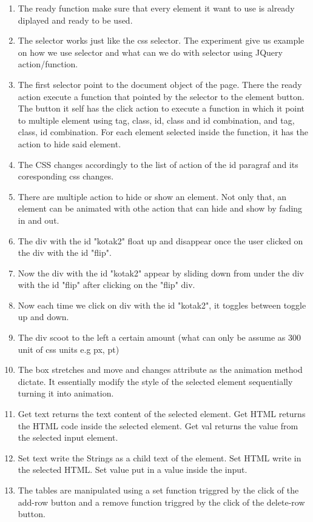 \documentclass[12pt,titlepage]{article}
\begin{document}
\begin{enumerate}
    \item The ready function make sure that every element it want to use is already diplayed and ready to be used.
    \item The selector works just like the css selector. The experiment give us example on how we use selector and what can we do with selector using JQuery action/function.
    \item The first selector point to the document object of the page. There the ready action execute a function that pointed by the selector to the element button. The button it self has the click action to execute a function in which it point to multiple element using tag, class, id, class and id combination, and tag, class, id combination. For each element selected inside the function, it has the action to hide said element.
    \item The CSS changes accordingly to the list of action of the id paragraf and its coresponding css changes.
    \item There are multiple action to hide or show an element. Not only that, an element can be animated with othe action that can hide and show by fading in and out. 
    \item The div with the id "kotak2" float up and disappear once the user clicked on the div with the id "flip".
    \item Now the div with the id "kotak2" appear by sliding down from under the div with the id "flip" after clicking on the "flip" div.
    \item Now each time we click on div with the id "kotak2", it toggles between toggle up and down.
    \item The div scoot to the left a certain amount (what can only be assume as 300 unit of css units e.g px, pt)
    \item The box stretches and move and changes attribute as the animation method dictate. It essentially modify the style of the selected element sequentially turning it into animation.
    \item Get text returns the text content of the selected element. Get HTML returns the HTML code inside the selected element. Get val returns the value from the selected input element.
    \item Set text write the Strings as a child text of the element. Set HTML write in the selected HTML. Set value put in a value inside the input.
    \item The tables are manipulated using a set function triggred by the click of the add-row button and a remove function triggred by the click of the delete-row button.

\end{enumerate}
\end{document}
